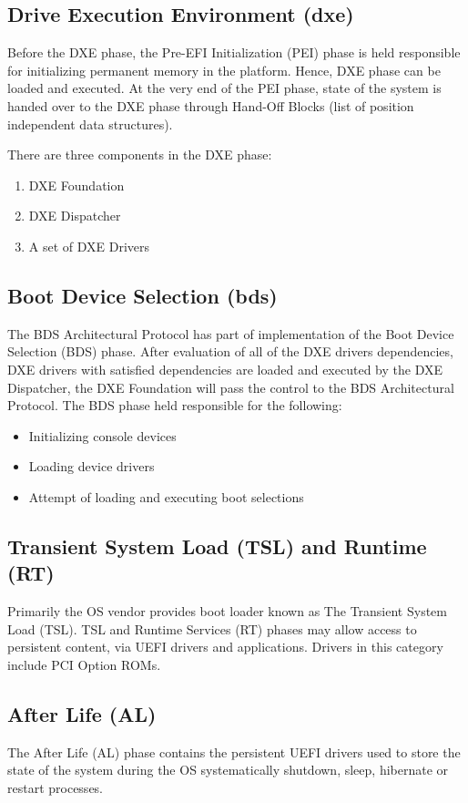 \subsection{Drive Execution Environment (\gls{dxe})}
Before the DXE phase, the Pre-EFI Initialization (PEI) phase is held responsible for initializing permanent memory in the platform. Hence, DXE phase can be loaded and executed. At the very end of the PEI phase, state of the system is handed over to the DXE phase through Hand-Off Blocks (list of position independent data structures). 

There are three components in the DXE phase:
\begin{enumerate}
	\item DXE Foundation
	\item DXE Dispatcher
	\item A set of DXE Drivers
\end{enumerate}

\subsection{Boot Device Selection (\gls{bds})}
The BDS Architectural Protocol has part of implementation of the Boot Device Selection (BDS) phase. After evaluation of all of the DXE drivers dependencies, DXE drivers with satisfied dependencies are loaded and executed by the DXE Dispatcher, the DXE Foundation will pass the control to the BDS Architectural Protocol. The BDS phase held responsible for the following:

\begin{itemize}
	\item Initializing console devices
	\item Loading device drivers
	\item Attempt of loading and executing boot selections
\end{itemize}

\subsection{Transient System Load (TSL) and Runtime (RT)}
Primarily the OS vendor provides boot loader known as The Transient System Load (TSL). TSL and Runtime Services (RT) phases may allow access to persistent content, via UEFI drivers and applications. Drivers in this category include PCI Option ROMs.

\subsection{After Life (AL)}
The After Life (AL) phase contains the persistent UEFI drivers used to store the state of the system during the OS systematically shutdown, sleep, hibernate or restart processes.

